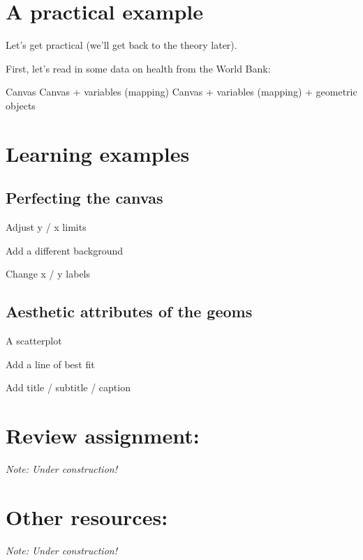 \documentclass[
]{book}
\begin{document}
\hypertarget{a-practical-example}{%
\section{A practical example}\label{a-practical-example}}

Let's get practical (we'll get back to the theory later).

First, let's read in some data on health from the World Bank:

Canvas
Canvas + variables (mapping)
Canvas + variables (mapping) + geometric objects

\hypertarget{learning-examples}{%
\section{Learning examples}\label{learning-examples}}

\hypertarget{perfecting-the-canvas}{%
\subsection{Perfecting the canvas}\label{perfecting-the-canvas}}

Adjust y / x limits

Add a different background

Change x / y labels

\hypertarget{aesthetic-attributes-of-the-geoms}{%
\subsection{Aesthetic attributes of the geoms}\label{aesthetic-attributes-of-the-geoms}}

A scatterplot

Add a line of best fit

Add title / subtitle / caption

\hypertarget{review-assignment-6}{%
\section{Review assignment:}\label{review-assignment-6}}

\emph{Note: Under construction!}

\hypertarget{other-resources-6}{%
\section{Other resources:}\label{other-resources-6}}

\emph{Note: Under construction!}
\end{document}
